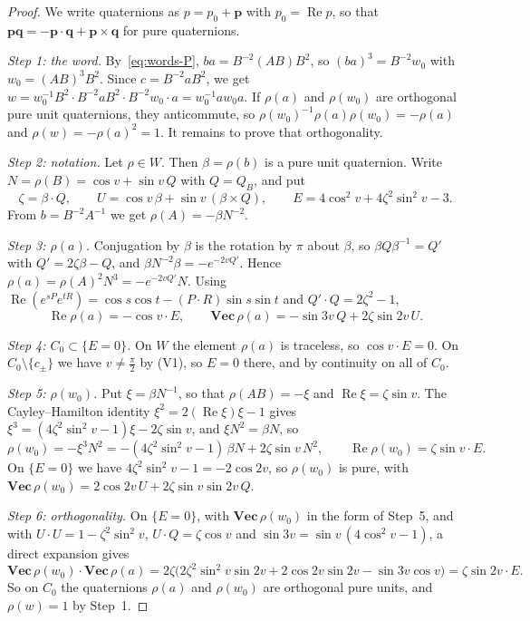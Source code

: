 \begin{proof}
We write quaternions as $p=p_0+\mathbf p$ with $p_0=\operatorname{Re}p$, so that $\mathbf p\mathbf q=-\mathbf p\cdot\mathbf q+\mathbf p\times\mathbf q$ for
pure quaternions.

\emph{Step 1: the word.} By~\eqref{eq:words-P}, $ba=B^{-2}(AB)B^2$, so $(ba)^3=B^{-2}w_0$ with $w_0=(AB)^3B^2$. Since
$c=B^{-2}aB^2$, we get $w=w_0^{-1}B^2\cdot B^{-2}aB^2\cdot B^{-2}w_0\cdot a=w_0^{-1}aw_0a$. If $\rho(a)$ and $\rho(w_0)$ are
orthogonal pure unit quaternions, they anticommute, so $\rho(w_0)^{-1}\rho(a)\rho(w_0)=-\rho(a)$ and $\rho(w)=-\rho(a)^2=1$. It remains to
prove that orthogonality.

\emph{Step 2: notation.} Let $\rho\in W$. Then $\beta=\rho(b)$ is a pure unit quaternion. Write $N=\rho(B)=\cos v+\sin v\,Q$
with $Q=Q_B$, and put
\[
\zeta=\beta\cdot Q,\qquad U=\cos v\,\beta+\sin v\,(\beta\times Q),\qquad E=4\cos^2v+4\zeta^2\sin^2v-3 .
\]
From $b=B^{-2}A^{-1}$ we get $\rho(A)=-\beta N^{-2}$.

\emph{Step 3: $\rho(a)$.} Conjugation by $\beta$ is the rotation by $\pi$ about $\beta$, so $\beta Q\beta^{-1}=Q'$ with $Q'=2\zeta\beta-Q$,
and $\beta N^{-2}\beta=-e^{-2vQ'}$. Hence $\rho(a)=\rho(A)^2N^3=-e^{-2vQ'}N$. Using
$\operatorname{Re}(e^{sP}e^{tR})=\cos s\cos t-(P\cdot R)\sin s\sin t$ and $Q'\cdot Q=2\zeta^2-1$,
\[
\operatorname{Re}\rho(a)=-\cos v\cdot E,\qquad \mathbf{Vec}\,\rho(a)=-\sin3v\,Q+2\zeta\sin2v\,U .
\]

\emph{Step 4: $C_0\subset\{E=0\}$.} On $W$ the element $\rho(a)$ is traceless, so $\cos v\cdot E=0$. On $C_0\setminus\{c_\pm\}$
we have $v\neq\frac\pi2$ by (V1), so $E=0$ there, and by continuity on all of $C_0$.

\emph{Step 5: $\rho(w_0)$.} Put $\xi=\beta N^{-1}$, so that $\rho(AB)=-\xi$ and $\operatorname{Re}\xi=\zeta\sin v$. The Cayley--Hamilton
identity $\xi^2=2(\operatorname{Re}\xi)\xi-1$ gives $\xi^3=(4\zeta^2\sin^2v-1)\xi-2\zeta\sin v$, and $\xi N^2=\beta N$, so
\[
\rho(w_0)=-\xi^3N^2=-(4\zeta^2\sin^2v-1)\,\beta N+2\zeta\sin v\,N^2,\qquad \operatorname{Re}\rho(w_0)=\zeta\sin v\cdot E .
\]
On $\{E=0\}$ we have $4\zeta^2\sin^2v-1=-2\cos2v$, so $\rho(w_0)$ is pure, with $\mathbf{Vec}\,\rho(w_0)=2\cos2v\,U+2\zeta\sin v\sin2v\,Q$.

\emph{Step 6: orthogonality.} On $\{E=0\}$, with $\mathbf{Vec}\,\rho(w_0)$ in the form of Step~5, and with $U\cdot U=1-\zeta^2\sin^2v$, $U\cdot Q=\zeta\cos v$ and $\sin3v=\sin v\,(4\cos^2v-1)$, a direct
expansion gives
\[
\mathbf{Vec}\,\rho(w_0)\cdot\mathbf{Vec}\,\rho(a)=2\zeta\bigl(2\zeta^2\sin^2v\sin2v+2\cos2v\sin2v-\sin3v\cos v\bigr)=\zeta\sin2v\cdot E .
\]
So on $C_0$ the quaternions $\rho(a)$ and $\rho(w_0)$ are orthogonal pure units, and $\rho(w)=1$ by Step~1.


\end{proof}
